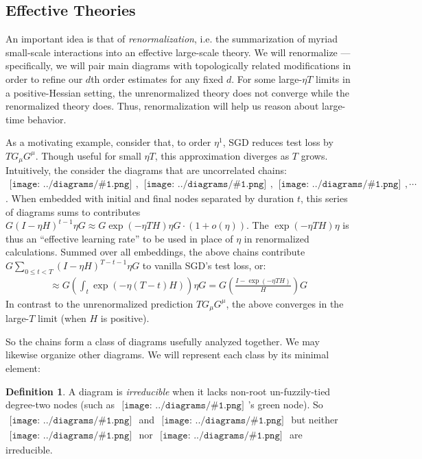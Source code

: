 \documentclass{article}
\theoremstyle{plain}
\theoremstyle{definition}
\newtheorem{defn}{Definition}
\newcommand{\wrap}[1]{\left(#1\right)}
\newcommand{\sdia}[1]{\begin{gathered}\texttt{[image: ../diagrams/\#1.png]}\end{gathered}}
\begin{document}

    \subsection{Effective Theories} \label{subsect:effective}
        An important idea is that of \emph{renormalization}, i.e. the
        summarization of myriad small-scale interactions into an effective
        large-scale theory.  We will renormalize --- specifically, we will
        pair main diagrams with topologically related modifications in order
        to refine our $d$th order estimates for any fixed $d$.  For
        some large-$\eta T$ limits in a positive-Hessian setting, the
        unrenormalized theory does not converge while the renormalized theory
        does.  Thus, renormalization will help us reason about large-time
        behavior. 

        As a motivating example, consider that, to order $\eta^1$, SGD reduces
        test loss by $T G_\mu G^\mu$.  Though useful for small $\eta T$, this
        approximation diverges as $T$ grows.  Intuitively, the  
        consider the diagrams that are uncorrelated
        chains:
        $
            \sdia{(0-1)(01)}, \sdia{(0-1-2)(01-12)},
            \sdia{(0-1-2-3)(01-12-23)}, \cdots
        $.  
        When embedded with initial and
        final nodes separated by duration $t$, this series of diagrams sums to
        contributes
        $
            G (I-\eta H)^{t-1} \eta G
            \approx
            G \exp(-\eta T H) \eta G
            \cdot (1+o(\eta))
        $.
        The $\exp(-\eta T H) \eta$ is thus an ``effective learning rate'' to
        be used in place of $\eta$ in renormalized calculations.
        Summed over all embeddings, the above chains contribute 
        $G \sum_{0\leq t<T} (I-\eta H)^{T-t-1} \eta G$
        to vanilla SGD's test loss, or:
        \begin{align*}
            \approx
            G \wrap{\int_t \exp(-\eta (T-t) H)} \eta G
            =
            G \wrap{\frac{I - \exp(-\eta T H)}{H}} G
        \end{align*}
        In contrast to the unrenormalized prediction $T G_\mu G^\mu$,
        the above converges in the large-$T$ limit (when $H$ is positive).

        So the chains form a class of diagrams usefully analyzed
        together.  We may likewise organize other diagrams.  We will
        represent each class by its minimal element:
        \begin{defn}
            A diagram is \emph{irreducible} when it lacks non-root
            un-fuzzily-tied degree-two nodes (such as $\sdia{(0-1-2)(01-12)}$'s
            {\color{moog}green} node).
            So
            $\sdia{(0-1-2)(02-12)}$ and
            $\sdia{(01-2)(02-12)}$
            but neither
            $\sdia{(0-1-2)(01-12)}$ nor
            $\sdia{(02-1-3)(01-12-23)}$
            are irreducible.
        \end{defn}
\end{document}
